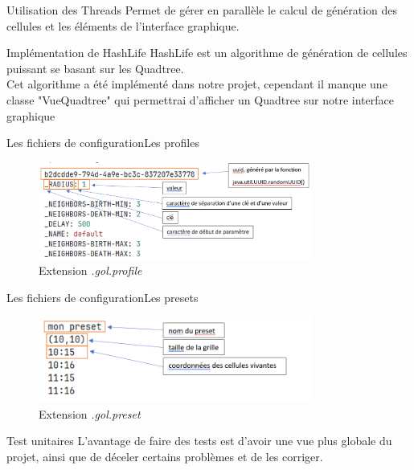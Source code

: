 \documentclass{beamer}
\begin{document}
	\begin{frame}{Utilisation des Threads}
		Permet de gérer en parallèle le calcul de génération des cellules et les éléments de l'interface graphique.
	\end{frame}

	\begin{frame}{Implémentation de HashLife}
		HashLife est un algorithme de génération de cellules puissant se basant sur les Quadtree.\\
		\vspace{0.2in}
		Cet algorithme a été implémenté dans notre projet, cependant il manque une classe "VueQuadtree" qui permettrai d'afficher un Quadtree sur notre interface graphique
	\end{frame}

	\begin{frame}{Les fichiers de configuration}{Les profiles}
		\begin{figure}
			\caption{Extension \emph{.gol.profile}}	
			\includegraphics[width=0.8\textwidth]{image/profiles.png}
		\end{figure}
	\end{frame}

	\begin{frame}{Les fichiers de configuration}{Les presets}
		\begin{figure}
			\caption{Extension \emph{.gol.preset}}	
			\includegraphics[width=0.8\textwidth]{image/presets.png}
		\end{figure}
	\end{frame}

	\begin{frame}{Test unitaires}
		L'avantage de faire des tests est d'avoir une vue plus globale du projet, ainsi que de déceler certains problèmes et de les corriger. 
	\end{frame}
\end{document}
